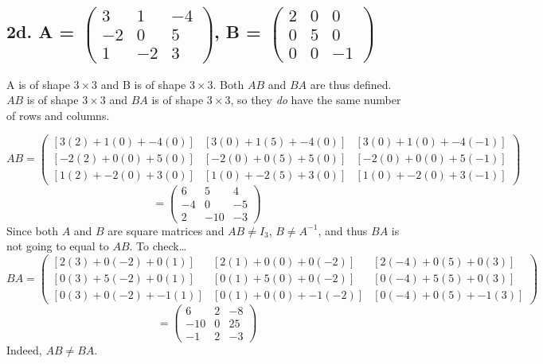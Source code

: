 \documentclass[11pt]{article}
\begin{document}
\subsection*{2d. A = \(
    \begin{pmatrix}
        3 & 1 & -4 \\
        -2 & 0 & 5 \\
        1 & -2 & 3
    \end{pmatrix}
    \), B = \(
        \begin{pmatrix}
            2 & 0 & 0 \\
            0 & 5 & 0 \\
            0 & 0 & -1
        \end{pmatrix}\)}
A is of shape \(3 \times 3\) and B is of shape \(3 \times 3\). Both \(AB\) and \(BA\) are thus defined. \(AB\) is of shape \(3 \times 3\) and \(BA\) is of shape \(3 \times 3\), so they \textit{do} have the same number of rows and columns.

\[
    AB = \begin{pmatrix}
        [3(2) + 1(0) + -4(0)] & [3(0) + 1(5) + -4(0)] & [3(0) + 1(0) + -4(-1)] \\
        [-2(2) + 0(0) + 5(0)] & [-2(0) + 0(5) + 5(0)] & [-2(0) + 0(0) + 5(-1)]\\
        [1(2) + -2(0) + 3(0)] & [1(0) + -2(5) + 3(0)] & [1(0) + -2(0) + 3(-1)]
    \end{pmatrix}
\]
\[
    = \begin{pmatrix}
        6 & 5 & 4 \\
        -4 & 0 & -5 \\
        2 & -10 & -3
    \end{pmatrix}
\]
Since both \(A\) and \(B\) are square matrices and \(AB \neq I_3\), \(B \neq A^{-1}\), and thus \(BA\) is not going to equal to \(AB\). To check\dots
\[
    BA = \begin{pmatrix}
        [2(3) + 0(-2) + 0(1)] & [2(1) + 0(0) + 0(-2)] & [2(-4) + 0(5) + 0(3)] \\
        [0(3) + 5(-2) + 0(1)] & [0(1) + 5(0) + 0(-2)] & [0(-4) + 5(5) + 0(3)] \\
        [0(3) + 0(-2) + -1(1)] & [0(1) + 0(0) + -1(-2)] & [0(-4) + 0(5) + -1(3)]
    \end{pmatrix}
\]
\[
    = \begin{pmatrix}
        6 & 2 & -8 \\
        -10 & 0 & 25 \\
        -1 & 2 & -3
    \end{pmatrix}
\]
Indeed, \(AB \neq BA\).\pagebreak
\end{document}
